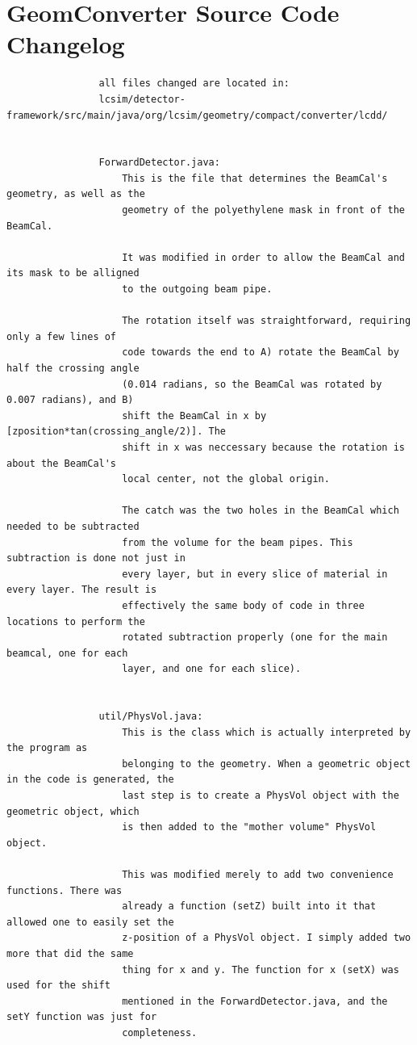 \documentclass{report}
\begin{document}
        \section{GeomConverter Source Code Changelog} \label{sect:geom_changes}
            \begin{verbatim}
                all files changed are located in:
                lcsim/detector-framework/src/main/java/org/lcsim/geometry/compact/converter/lcdd/


                ForwardDetector.java:
                    This is the file that determines the BeamCal's geometry, as well as the
                    geometry of the polyethylene mask in front of the BeamCal.
                    
                    It was modified in order to allow the BeamCal and its mask to be alligned
                    to the outgoing beam pipe.
                    
                    The rotation itself was straightforward, requiring only a few lines of
                    code towards the end to A) rotate the BeamCal by half the crossing angle
                    (0.014 radians, so the BeamCal was rotated by 0.007 radians), and B) 
                    shift the BeamCal in x by [zposition*tan(crossing_angle/2)]. The
                    shift in x was neccessary because the rotation is about the BeamCal's
                    local center, not the global origin. 

                    The catch was the two holes in the BeamCal which needed to be subtracted
                    from the volume for the beam pipes. This subtraction is done not just in
                    every layer, but in every slice of material in every layer. The result is
                    effectively the same body of code in three locations to perform the
                    rotated subtraction properly (one for the main beamcal, one for each
                    layer, and one for each slice). 


                util/PhysVol.java:
                    This is the class which is actually interpreted by the program as
                    belonging to the geometry. When a geometric object in the code is generated, the
                    last step is to create a PhysVol object with the geometric object, which
                    is then added to the "mother volume" PhysVol object.

                    This was modified merely to add two convenience functions. There was
                    already a function (setZ) built into it that allowed one to easily set the
                    z-position of a PhysVol object. I simply added two more that did the same
                    thing for x and y. The function for x (setX) was used for the shift
                    mentioned in the ForwardDetector.java, and the setY function was just for
                    completeness.



\end{verbatim}
\end{document}
